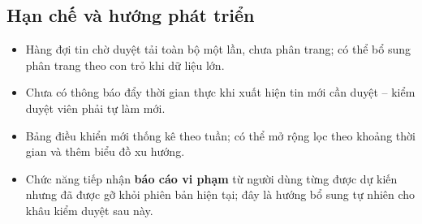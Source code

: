 \subsection{Hạn chế và hướng phát triển}
\begin{itemize}
    \item Hàng đợi tin chờ duyệt tải toàn bộ một lần, chưa phân trang; có thể bổ
    sung phân trang theo con trỏ khi dữ liệu lớn.
    \item Chưa có thông báo đẩy thời gian thực khi xuất hiện tin mới cần duyệt --
    kiểm duyệt viên phải tự làm mới.
    \item Bảng điều khiển mới thống kê theo tuần; có thể mở rộng lọc theo khoảng
    thời gian và thêm biểu đồ xu hướng.
    \item Chức năng tiếp nhận \textbf{báo cáo vi phạm} từ người dùng từng được dự
    kiến nhưng đã được gỡ khỏi phiên bản hiện tại; đây là hướng bổ sung tự nhiên
    cho khâu kiểm duyệt sau này.
\end{itemize}
